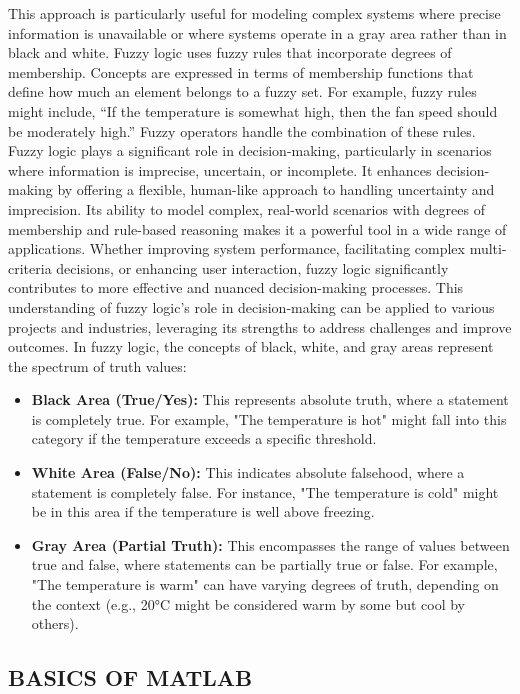 \documentclass[12pt,a4paper]{article}
\begin{document}
This approach is particularly useful for modeling complex systems where precise information is unavailable or where systems operate in a gray area rather than in black and white. Fuzzy logic uses fuzzy rules that incorporate degrees of membership. Concepts are expressed in terms of membership functions that define how much an element belongs to a fuzzy set. For example, fuzzy rules might include, “If the temperature is somewhat high, then the fan speed should be moderately high.” Fuzzy operators handle the combination of these rules. Fuzzy logic plays a significant role in decision-making, particularly in scenarios where information is imprecise, uncertain, or incomplete. It enhances decision-making by offering a flexible, human-like approach to handling uncertainty and imprecision. Its ability to model complex, real-world scenarios with degrees of membership and rule-based reasoning makes it a powerful tool in a wide range of applications. Whether improving system performance, facilitating complex multi-criteria decisions, or enhancing user interaction, fuzzy logic significantly contributes to more effective and nuanced decision-making processes. This understanding of fuzzy logic’s role in decision-making can be applied to various projects and industries, leveraging its strengths to address challenges and improve outcomes. In fuzzy logic, the concepts of black, white, and gray areas represent the spectrum of truth values:
\begin{itemize}

\item\textbf{Black Area (True/Yes):} This represents absolute truth, where a statement is completely true. For example, "The temperature is hot" might fall into this category if the temperature exceeds a specific threshold.
\item\textbf{White Area (False/No):} This indicates absolute falsehood, where a statement is completely false. For instance, "The temperature is cold" might be in this area if the temperature is well above freezing.
\item\textbf{Gray Area (Partial Truth):} This encompasses the range of values between true and false, where statements can be partially true or false. For example, "The temperature is warm" can have varying degrees of truth, depending on the context (e.g., 20°C might be considered warm by some but cool by others).

\end{itemize}



\subsection{BASICS OF MATLAB}
\end{document}
